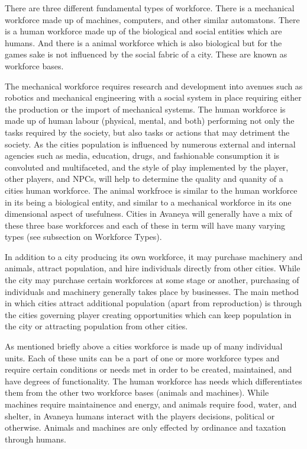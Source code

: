 There are three different fundamental types of workforce. There is a mechanical workforce made up of machines, computers, and other similar automatons. There is a human workforce made up of the biological and social entities which are humans. And there is a animal workforce which is also biological but for the games sake is not influenced by the social fabric of a city. These are known as workforce bases. 

The mechanical workforce requires research and development into avenues such as robotics and mechanical engineering with a social system in place requiring either the production or the import of mechanical systems. The human workforce is made up of human labour (physical, mental, and both) performing not only the tasks required by the society, but also tasks or actions that may detriment the society. As the cities population is influenced by numerous external and internal agencies such as media, education, drugs, and fashionable consumption it is convoluted and multifaceted, and the style of play implemented by the player, other players, and NPCs, will help to determine the quality and quanity of a cities human workforce. The animal workfroce is similar to the human workforce in its being a biological entity, and similar to a mechanical workforce in its one dimensional aspect of usefulness. Cities in Avaneya will generally have a mix of these three base workforces and each of these in term will have many varying types (see subsection on Workforce Types). 

In addition to a city producing its own workforce, it may purchase machinery and animals, attract population, and hire individuals directly from other cities. While the city may purchase certain workforces at some stage or another, purchasing of individuals and machinery generally takes place by businesses. The main method in which cities attract additional population (apart from reproduction) is through the cities governing player creating opportunities which can keep population in the city or attracting population from other cities. 


As mentioned briefly above a cities workforce is made up of many individual units. Each of these units can be a part of one or more workforce types and require certain conditions or needs met in order to be created, maintained, and have degrees of functionality. The human workforce has needs which differentiates them from the other two workforce bases (animals and machines). While machines require maintainence and energy, and animals require food, water, and shelter, in Avaneya humans interact with the players decisions, political or otherwise. Animals and machines are only effected by ordinance and taxation through humans. 

